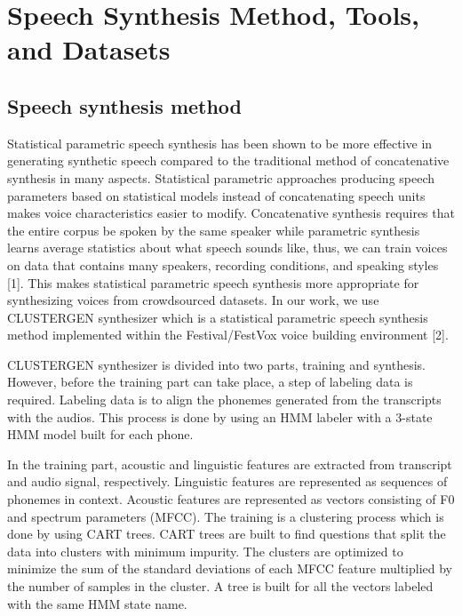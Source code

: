 \documentclass[12pt]{article}
\begin{document}

\clearpage
\section{Speech Synthesis Method, Tools, and Datasets}\label{sec_methodToolsDatasets}

\subsection{Speech synthesis method}
Statistical parametric speech synthesis has been shown to be more effective in generating synthetic speech compared to the traditional method of concatenative synthesis in many aspects. Statistical parametric approaches producing speech parameters based on statistical models instead of concatenating speech units makes voice characteristics easier to modify. Concatenative synthesis requires that the entire corpus be spoken by the same speaker while parametric synthesis learns average statistics about what speech sounds like, thus, we can train voices on data that contains many speakers, recording conditions, and speaking styles [1]. This makes statistical parametric speech synthesis more appropriate for synthesizing voices from crowdsourced datasets. In our work, we use CLUSTERGEN synthesizer which is a statistical parametric speech synthesis method implemented within the Festival/FestVox voice building environment [2].

CLUSTERGEN synthesizer is divided into two parts, training and synthesis. However, before the training part can take place, a step of labeling data is required. Labeling data is to align the phonemes generated from the transcripts with the audios. This process is done by using an HMM labeler with a 3-state HMM model built for each phone.

In the training part, acoustic and linguistic features are extracted from transcript and audio signal, respectively. Linguistic features are represented as sequences of phonemes in context. Acoustic features are represented as vectors consisting of F0 and spectrum parameters (MFCC). The training is a clustering process which is done by using CART trees. CART trees are built to find questions that split the data into clusters with minimum impurity. The clusters are optimized to minimize the sum of the standard deviations of each MFCC feature multiplied by the number of samples in the cluster. A tree is built for all the vectors labeled with the same HMM state name.
\end{document}
